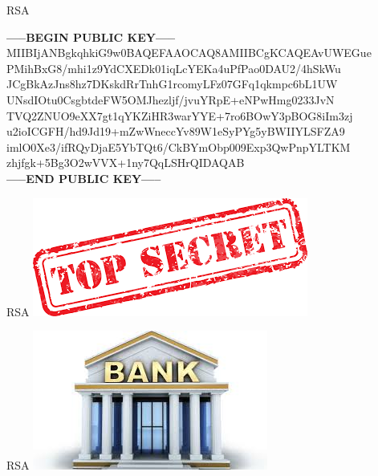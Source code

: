 \documentclass{beamer}
\begin{document}
\begin{frame}{RSA}

\textbf{-----BEGIN PUBLIC KEY-----}\\
MIIBIjANBgkqhkiG9w0BAQEFAAOCAQ8AMIIBCgKCAQEAvUWEGue
PMihBxG8/mhi1z9YdCXEDk01iqLcYEKa4uPfPao0DAU2/4hSkWu
JCgBkAzJns8hz7DKskdRrTnhG1rcomyLFz07GFq1qkmpc6bL1UW
UNsdIOtu0CsgbtdeFW5OMJhezljf/jvuYRpE+eNPwHmg0233JvN
TVQ2ZNUO9eXX7gt1qYKZiHR3warYYE+7ro6BOwY3pBOG8iIm3zj
u2ioICGFH/hd9Jd19+mZwWneccYv89W1eSyPYg5yBWIIYLSFZA9
imlO0Xe3/ifRQyDjaE5YbTQt6/CkBYmObp009Exp3QwPnpYLTKM
zhjfgk+5Bg3O2wVVX+1ny7QqLSHrQIDAQAB\\
\textbf{-----END PUBLIC KEY-----}
\end{frame}

\begin{frame}{RSA}
	\includegraphics[width=\textwidth]{img/secret.png}
\end{frame}

\begin{frame}{RSA}
	\includegraphics[width=\textwidth]{img/bank.jpg}
\end{frame}
\end{document}
